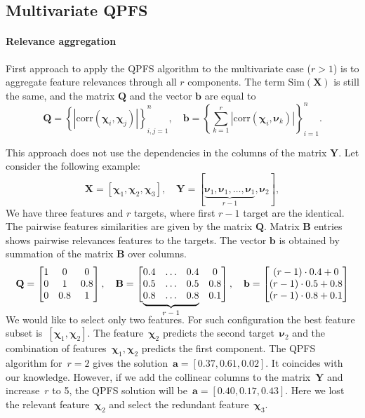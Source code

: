 \documentclass[12pt,twoside]{article}
\newcommand{\ba}{\mathbf{a}}
\newcommand{\bb}{\mathbf{b}}
\newcommand{\bY}{\mathbf{Y}}
\newcommand{\bX}{\mathbf{X}}
\newcommand{\bB}{\mathbf{B}}
\newcommand{\bQ}{\mathbf{Q}}
\newcommand{\bchi}{\boldsymbol{\chi}}
\newcommand{\bnu}{\boldsymbol{\nu}}
\newcommand\undermat[2]{%
	\makebox[0pt][l]{$\smash{\underbrace{\phantom{%
					\begin{matrix}#2\end{matrix}}}_{\text{$#1$}}}$}#2}
\begin{document}
\subsection{Multivariate QPFS}

\paragraph{Relevance aggregation}

First approach to apply the QPFS algorithm to the multivariate case ($r > 1$) is to aggregate feature relevances through all $r$ components. The term $\text{Sim}(\bX)$ is still the same, and the matrix $\bQ$ and the vector $\bb$ are equal to
\begin{equation*}
\bQ = \left\{\left|\text{corr}(\bchi_i, \bchi_j)\right|\right\}_{i,j=1}^n, \quad \bb = \left\{\sum_{k=1}^r\left|\text{corr}(\bchi_i, \bnu_k)\right|\right\}_{i=1}^n.
\end{equation*}

This approach does not use the dependencies in the columns of the matrix $\bY$. Let consider the following example:
\[
	\bX = [\bchi_1, \bchi_2, \bchi_3], \quad \bY = [\underbrace{\bnu_1, \bnu_1, \dots, \bnu_1}_{r-1}, \bnu_2],
\]
We have three features and $r$ targets, where first $r-1$ target are the identical. 
The pairwise features similarities are given by the matrix $\bQ$. 
Matrix $\bB$ entries shows pairwise relevances features to the targets. 
The vector $\bb$ is obtained by summation of the matrix $\bB$ over columns.
\[
	\bQ = \begin{bmatrix} 1 & 0 & 0\\ 0 & 1 & 0.8 \\ 0 & 0.8 & 1 \end{bmatrix}, \quad 
	\bB = \begin{bmatrix} 0.4 & \dots & 0.4 & 0 \\ 0.5 & \dots & 0.5 & 0.8 \\ \undermat{r-1}{0.8 & \dots & 0.8} & 0.1 \end{bmatrix}, \quad
	\bb = \begin{bmatrix} (r-1) \cdot 0.4 + 0 \\ (r-1) \cdot 0.5 + 0.8 \\ (r-1) \cdot 0.8 + 0.1 \end{bmatrix}
\]
	\vspace{0.5cm}

We would like to select only two features.
For such configuration the best feature subset is~$[\bchi_1, \bchi_2]$. 
The feature~$\bchi_2$ predicts the second target~$\bnu_2$ and the combination of features~$\bchi_1, \bchi_2$ predicts the first component. 
The QPFS algorithm for~$r=2$ gives the solution~$\ba = [0.37,	0.61,	0.02]$. It coincides with our knowledge. 
However, if we add the collinear columns to the matrix~$\bY$ and increase~$r$ to 5, the QPFS solution will be~$\ba = [0.40,	0.17, 0.43]$. 
Here we lost the relevant feature~$\bchi_2$ and select the redundant feature~$\bchi_3$.
\end{document}
